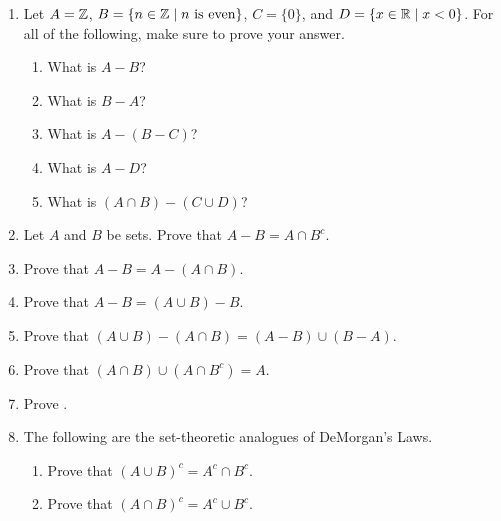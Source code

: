 \probsec{~\ref{sec:compl-set-diff}}
\begin{enumerate}
    \item Let $A = \mathbb{Z}$, $B = \{n \in \mathbb{Z} \mid n \text{ is even}\}$, $C = \{0\}$, and $D = \{x \in \mathbb{R} \mid x <0\}$. For all of the following, make sure to prove your answer.
  \begin{enumerate}
      \item What is $A - B$?
      \item What is $B - A$?
      \item What is $A - (B - C)$?
      \item What is $A - D$?
      \item What is $(A \cap B) - (C \cup D)$?
  \end{enumerate}

    \item Let $A$ and $B$ be sets. Prove that $A - B = A \cap B^c$.

    \item Prove that $A - B = A - (A \cap B)$.

    \item Prove that $A - B = (A \cup B) - B$.

    \item Prove that $(A \cup B) - (A \cap B) = (A - B) \cup (B - A)$.

    \item Prove that $(A \cap B) \cup (A \cap B^c) = A$.

    \item Prove .

    \item The following are the set-theoretic analogues of DeMorgan's Laws.
  \begin{enumerate}
      \item Prove that $(A \cup B)^c = A^c \cap B^c$.
      \item Prove that $(A \cap B)^c = A^c \cup B^c$.
  \end{enumerate}

\end{enumerate}
